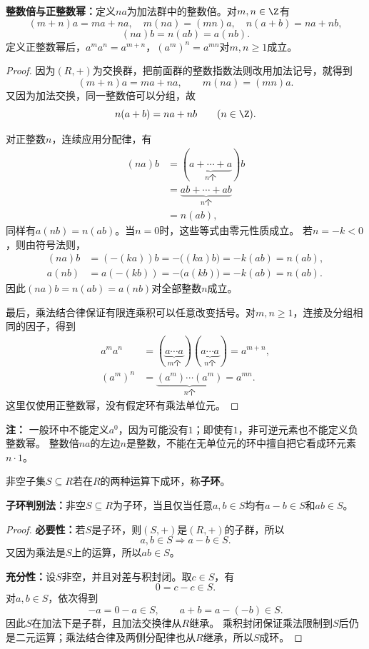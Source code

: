 \begin{proposition}
\label{p2:concept:c1-l830}\textbf{整数倍与正整数幂：}定义$na$为加法群中的整数倍。对$m,n\in\Z$有
\[
(m+n)a=ma+na,\quad m(na)=(mn)a,\quad n(a+b)=na+nb,
\]
\[
(na)b=n(ab)=a(nb).
\]
定义正整数幂后，$a^ma^n=a^{m+n}$，$(a^m)^n=a^{mn}$对$m,n\geq1$成立。
\end{proposition}
\begin{proof}
因为$(R,+)$为交换群，把前面群的整数指数法则改用加法记号，就得到
\[
(m+n)a=ma+na,\qquad m(na)=(mn)a.
\]
又因为加法交换，同一整数倍可以分组，故
\[
n(a+b)=na+nb\qquad(n\in\Z).
\]

对正整数$n$，连续应用分配律，有
\[
\begin{aligned}
(na)b
&=(\underbrace{a+\cdots+a}_{n\text{个}})b\\
&=\underbrace{ab+\cdots+ab}_{n\text{个}}\\
&=n(ab),
\end{aligned}
\]
同样有$a(nb)=n(ab)$。当$n=0$时，这些等式由零元性质成立。
若$n=-k<0$，则由符号法则，
\[
\begin{aligned}
(na)b&=(-(ka))b=-\bigl((ka)b\bigr)=-k(ab)=n(ab),\\
a(nb)&=a(-(kb))=-\bigl(a(kb)\bigr)=-k(ab)=n(ab).
\end{aligned}
\]
因此$(na)b=n(ab)=a(nb)$对全部整数$n$成立。

最后，乘法结合律保证有限连乘积可以任意改变括号。对$m,n\geq1$，连接及分组相同的因子，得到
\[
\begin{aligned}
a^ma^n
&=(\underbrace{a\cdots a}_{m\text{个}})(\underbrace{a\cdots a}_{n\text{个}})
=a^{m+n},\\
(a^m)^n
&=\underbrace{(a^m)\cdots(a^m)}_{n\text{个}}
=a^{mn}.
\end{aligned}
\]
这里仅使用正整数幂，没有假定环有乘法单位元。
\end{proof}
\textbf{注：}
一般环中不能定义$a^0$，因为可能没有$1$；即使有$1$，非可逆元素也不能定义负整数幂。
整数倍$na$的左边$n$是整数，不能在无单位元的环中擅自把它看成环元素$n\cdot1$。


\begin{definition}
\label{p2:concept:c1-l887}非空子集$S\subseteq R$若在$R$的两种运算下成环，称\textbf{子环}。
\end{definition}
\begin{theorem}
\textbf{子环判别法：}非空$S\subseteq R$为子环，当且仅当任意$a,b\in S$均有$a-b\in S$和$ab\in S$。
\end{theorem}
\begin{proof}
\textbf{必要性：}若$S$是子环，则$(S,+)$是$(R,+)$的子群，所以
\[
a,b\in S\Longrightarrow a-b\in S.
\]
又因为乘法是$S$上的运算，所以$ab\in S$。

\textbf{充分性：}设$S$非空，并且对差与积封闭。取$c\in S$，有
\[
0=c-c\in S.
\]
对$a,b\in S$，依次得到
\[
-a=0-a\in S,\qquad a+b=a-(-b)\in S.
\]
因此$S$在加法下是子群，且加法交换律从$R$继承。
乘积封闭保证乘法限制到$S$后仍是二元运算；乘法结合律及两侧分配律也从$R$继承，所以$S$成环。
\end{proof}

